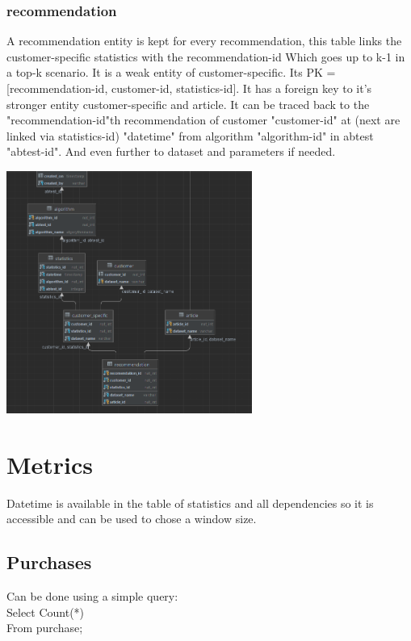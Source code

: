 \documentclass[a4paper,12pt]{article}
\begin{document}
	\subsubsection{recommendation}
	A recommendation entity is kept for every recommendation, this table links the customer-specific statistics with the recommendation-id Which goes up to k-1 in a top-k scenario. It is a weak entity of customer-specific. Its PK = [recommendation-id, customer-id, statistics-id]. It has a foreign key to it's stronger entity customer-specific and article. It can be traced back to the "recommendation-id"th recommendation of customer "customer-id" at (next are linked via statistics-id) "datetime" from algorithm "algorithm-id" in abtest "abtest-id". And even further to dataset and parameters if needed.  
	\begin{center}

		\includegraphics[height={300px}]{Customer-Specific.png}

\end{center}		
\section{Metrics}
Datetime is available in the table of statistics and all dependencies so it is accessible and can be used to chose a window size.
\subsection{Purchases}
Can be done using a simple query: \\
	Select Count(*)\\
	From purchase;\\
\end{document}
